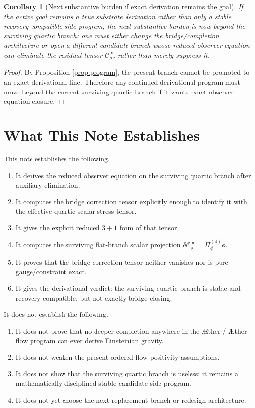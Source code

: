 \documentclass[11pt]{article}
\newcommand{\Aether}{\AE{}ther}
\newcommand{\Aflow}{\AE{}ther-flow}
\newtheorem{corollary}{Corollary}
\begin{document}
\begin{corollary}[Next substantive burden if exact derivation remains the goal]
\label{cor:next}
If the active goal remains a true substrate derivation rather than only a stable recovery-compatible side program, the next substantive burden is now beyond the surviving quartic branch: one must either change the bridge/completion architecture or open a different candidate branch whose reduced observer equation can eliminate the residual tensor \(\mathcal C_{\mu\nu}^{\mathrm{br}}\) rather than merely suppress it.
\end{corollary}

\begin{proof}
By Proposition \ref{prop:program}, the present branch cannot be promoted to an exact derivational line. Therefore any continued derivational program must move beyond the current surviving quartic branch if it wants exact observer-equation closure.
\end{proof}

\section{What This Note Establishes}

This note establishes the following.
\begin{enumerate}
    \item It derives the reduced observer equation on the surviving quartic branch after auxiliary elimination.
    \item It computes the bridge correction tensor explicitly enough to identify it with the effective quartic scalar stress tensor.
    \item It gives the explicit reduced \(3+1\) form of that tensor.
    \item It computes the surviving flat-branch scalar projection \(\delta\mathcal C_\phi^{\mathrm{br}}=\Pi_\phi^{(4)}\phi\).
    \item It proves that the bridge correction tensor neither vanishes nor is pure gauge/constraint exact.
    \item It gives the derivational verdict: the surviving quartic branch is stable and recovery-compatible, but not exactly bridge-closing.
\end{enumerate}

It does not establish the following.
\begin{enumerate}
    \item It does not prove that no deeper completion anywhere in the \Aether{} / \Aflow{} program can ever derive Einsteinian gravity.
    \item It does not weaken the present ordered-flow positivity assumptions.
    \item It does not show that the surviving quartic branch is useless; it remains a mathematically disciplined stable candidate side program.
    \item It does not yet choose the next replacement branch or redesign architecture.
\end{enumerate}
\end{document}
